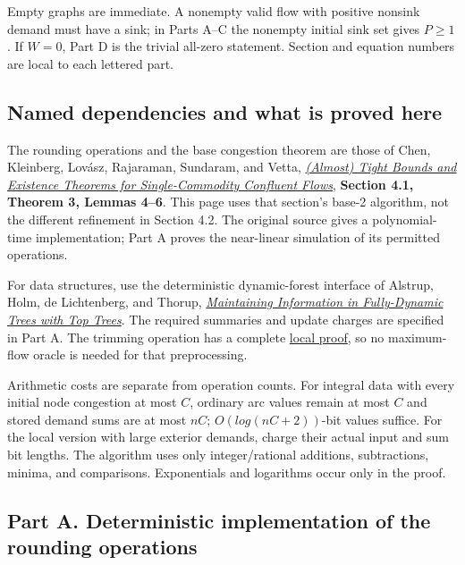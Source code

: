 Empty graphs are immediate. A nonempty valid flow with positive nonsink demand must have a sink; in Parts A--C the nonempty initial sink set gives \(P≥1\). If \(W=0\), Part D is the trivial all-zero statement. Section and equation numbers are local to each lettered part.

\hypertarget{af-385fd70686-named-dependencies-and-what-is-proved-here}{%
\subsection{Named dependencies and what is proved here}\label{af-385fd70686-named-dependencies-and-what-is-proved-here}}

The rounding operations and the base congestion theorem are those of Chen, Kleinberg, Lovász, Rajaraman, Sundaram, and Vetta, \href{https://www.cs.cornell.edu/~rdk/papers/conflu.pdf}{\emph{(Almost) Tight Bounds and Existence Theorems for Single-Commodity Confluent Flows}}, \textbf{Section 4.1, Theorem 3, Lemmas 4--6}. This page uses that section's base-2 algorithm, not the different refinement in Section 4.2. The original source gives a polynomial-time implementation; Part A proves the near-linear simulation of its permitted operations.

For data structures, use the deterministic dynamic-forest interface of Alstrup, Holm, de Lichtenberg, and Thorup, \href{https://arxiv.org/abs/cs/0310065}{\emph{Maintaining Information in Fully-Dynamic Trees with Top Trees}}. The required summaries and update charges are specified in Part A. The trimming operation has a complete \href{https://github.com/icekylinx/algorithm-frontier/blob/main/manuscripts/graph-backends/exact-demand-flow-trimming.md}{local proof}, so no maximum-flow oracle is needed for that preprocessing.

Arithmetic costs are separate from operation counts. For integral data with every initial node congestion at most \(C\), ordinary arc values remain at most \(C\) and stored demand sums are at most \(nC\); \(O(log(nC+2))\)-bit values suffice. For the local version with large exterior demands, charge their actual input and sum bit lengths. The algorithm uses only integer/rational additions, subtractions, minima, and comparisons. Exponentials and logarithms occur only in the proof.

\hypertarget{af-385fd70686-part-a.-deterministic-implementation-of-the-rounding-operations}{%
\subsection{Part A. Deterministic implementation of the rounding operations}\label{af-385fd70686-part-a.-deterministic-implementation-of-the-rounding-operations}}


